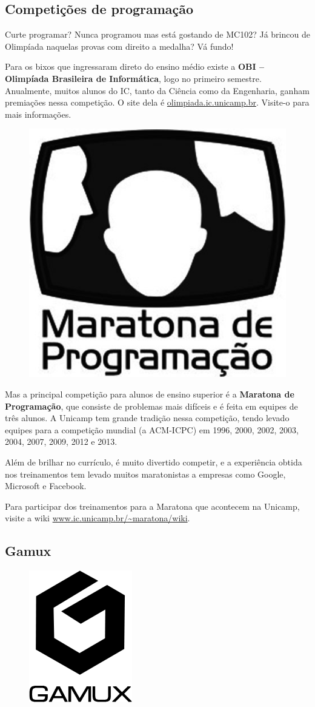 \subsection{Competições de programação}

Curte programar? Nunca programou mas está gostando de MC102? Já brincou de
Olimpíada naquelas provas com direito a medalha? Vá fundo!

Para os bixos que ingressaram direto do ensino médio existe a \textbf{OBI --
Olimpíada Brasileira de Informática}, logo no primeiro semestre.  Anualmente,
muitos alunos do IC, tanto da Ciência como da Engenharia, ganham premiações
nessa competição. O site dela é \url{olimpiada.ic.unicamp.br}.  Visite-o para
mais informações.

\begin{figure}[h!]
    \centering
    \includegraphics[width=.35\textwidth]{img/alem_da_graduacao/maratona_logo.png}
\end{figure}

Mas a principal competição para alunos de ensino superior é a \textbf{Maratona
de Programação}, que consiste de problemas mais difíceis e é feita em equipes de
três alunos. A Unicamp tem grande tradição nessa competição, tendo levado
equipes para a competição mundial (a ACM-ICPC) em 1996, 2000, 2002, 2003, 2004,
2007, 2009, 2012 e 2013.

Além de brilhar no currículo, é muito divertido competir, e a experiência obtida
nos treinamentos tem levado muitos maratonistas a empresas como Google,
Microsoft e Facebook.

Para participar dos treinamentos para a Maratona que acontecem na Unicamp,
visite a wiki \url{www.ic.unicamp.br/~maratona/wiki}.

\subsection{Gamux}

\begin{figure}[h!]
    \centering
    \includegraphics[width=.2\textwidth]{img/alem_da_graduacao/gamux_logo.png}
\end{figure}

